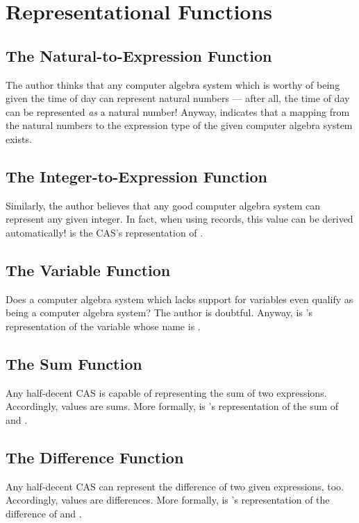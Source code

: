 \documentclass{report}
\begin{document}
\section{Representational Functions}

\subsection{The Natural-to-Expression Function}
The author thinks that any computer algebra system which is worthy of being given the time of day can represent natural numbers --- after all, the time of day can be represented \emph{as} a natural number!  Anyway,  indicates that a mapping from the natural numbers to the expression type of the given computer algebra system exists.

\subsection{The Integer-to-Expression Function}
Similarly, the author believes that any good computer algebra system can represent any given integer.  In fact, when using  records, this value can be derived automatically!     is the  CAS's representation of .

\subsection{The Variable Function}
Does a computer algebra system which lacks support for variables even qualify as being a computer algebra system?  The author is doubtful.  Anyway,    is 's representation of the variable whose name is .

\subsection{The Sum Function}
Any half-decent CAS is capable of representing the sum of two expressions.  Accordingly, \AgdaField{\AgdaUnderscore{}+\AgdaUnderscore{}} values are sums.  More formally,     is 's representation of the sum of  and .

\subsection{The Difference Function}
Any half-decent CAS can represent the difference of two given expressions, too.  Accordingly, \AgdaField{\AgdaUnderscore{}-\AgdaUnderscore{}} values are differences.  More formally,     is 's representation of the difference of  and .
\end{document}
